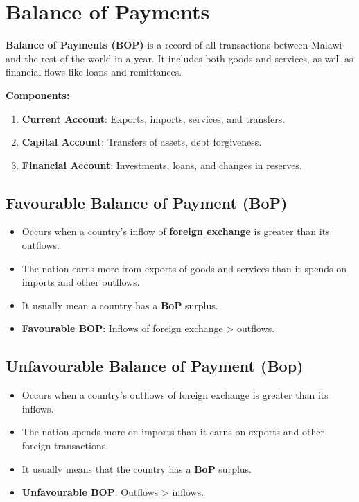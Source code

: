 \documentclass[12pt,a4paper, openany]{book}
\begin{document}
\section{Balance of Payments}
\textbf{Balance of Payments (BOP)} is a record of all transactions between Malawi and the rest of the world in a year.
It includes both goods and services, as well as financial flows like loans and remittances.

\textbf{Components:}
\begin{enumerate}
	\item \textbf{Current Account}: Exports, imports, services, and transfers.
	\item \textbf{Capital Account}: Transfers of assets, debt forgiveness.
	\item \textbf{Financial Account}: Investments, loans, and changes in reserves.
\end{enumerate}

\subsection{Favourable Balance of Payment (BoP)}
\begin{itemize}
	\item Occurs when a country's inflow of \textbf{foreign exchange} is greater than its outflows.
	\item The nation earns more from exports of goods and services than it spends on imports and other outflows.
	\item It usually mean a country has a \textbf{BoP} surplus.
	\item \textbf{Favourable BOP}: Inflows of foreign exchange > outflows.
\end{itemize}

\subsection{Unfavourable Balance of Payment (Bop)}
\begin{itemize}
	\item Occurs when a country's outflows of foreign exchange is greater than its inflows.
	\item The nation spends more on imports than it earns on exports and other foreign transactions.
	\item It usually means that the country has a \textbf{BoP} surplus.
	\item \textbf{Unfavourable BOP}: Outflows > inflows.
\end{itemize}
\end{document}
